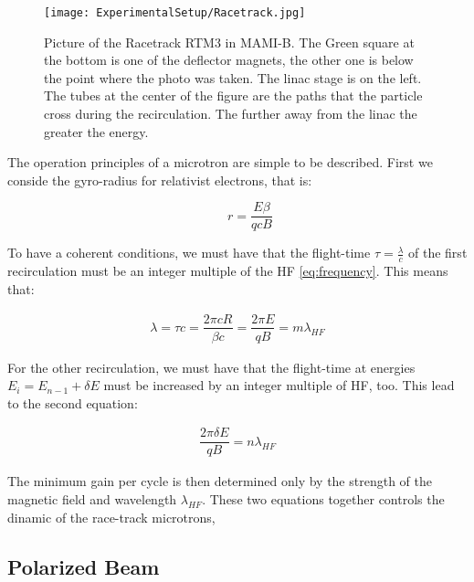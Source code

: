 \begin{figure}[hbtp]
\centering
\texttt{[image: ExperimentalSetup/Racetrack.jpg]}
\caption{Picture of the Racetrack RTM3 in MAMI-B. The Green square at the bottom is one of the deflector magnets, the other one is below the point where the photo was taken. The linac stage is on the left. The tubes at the center of the figure are the paths that the particle cross during the recirculation. The further away from the linac the greater the energy.}
\end{figure}

The operation principles of a microtron are simple to be described. First we conside the gyro-radius for relativist electrons, that is:

\begin{equation}
\qquad r = \dfrac{E \beta}{qcB}
\end{equation}

To have a coherent conditions, we must have that the flight-time $\tau = \frac{\lambda}{c}$ of the first recirculation must be an integer multiple of the HF \ref{eq:frequency}. This means that:

\begin{align*}
\lambda = \tau c =\dfrac{ 2 \pi c R }{\beta c} = \dfrac{2 \pi E}{q B} = m \lambda_{HF}
\end{align*}

For the other recirculation, we must have that the flight-time at energies $E_{i} = E_{n-1} + \delta E$ must be increased by an integer multiple of HF, too. This lead to the second equation:

\begin{align*}
\dfrac{2 \pi \delta E}{q B} = n \lambda_{HF}
\end{align*}

The minimum gain per cycle is then determined only by the strength of the magnetic field and wavelength $\lambda_{HF}$. These two equations together controls the dinamic of the race-track microtrons,

\subsection{Polarized Beam}
 \medskip

